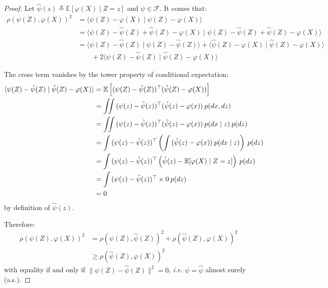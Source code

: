 \begin{proof}
	Let $\hat{\psi}(z)\triangleq\mathbb{E}[\varphi(X)\mid Z=z]$ and $\psi\in\mathcal{F}$. It comes that:
	\begin{equation}
		\begin{aligned}
		\rho(\psi(Z),\varphi(X))^2&=\langle\psi(Z)-\varphi(X)\mid\psi(Z)-\varphi(X)\rangle\\
		&=\langle\psi(Z)-\hat{\psi}(Z)+\hat{\psi}(Z)-\varphi(X)\mid\psi(Z)-\hat{\psi}(Z)+\hat{\psi}(Z)-\varphi(X)\rangle\\
		&=\langle\psi(Z)-\hat{\psi}(Z)\mid\psi(Z)-\hat{\psi}(Z)\rangle+\langle\hat{\psi}(Z)-\varphi(X)\mid\hat{\psi}(Z)-\varphi(X)\rangle\\
		&\qquad+2\langle\psi(Z)-\hat{\psi}(Z)\mid\hat{\psi}(Z)-\varphi(X)\rangle
		\end{aligned}
	\end{equation}

	The cross term vanishes by the tower property of conditional expectation:
	\begin{equation}
		\begin{aligned}
		\langle\psi(Z)-\hat{\psi}(Z)\mid\hat{\psi}(Z)-\varphi(X)\rangle&=\mathbb{E}\left[(\psi(Z)-\hat{\psi}(Z))^\top(\hat{\psi}(Z)-\varphi(X))\right]\\
		&=\iint{(\psi(z)-\hat{\psi}(z))^\top(\hat{\psi}(z)-\varphi(x))\:p(dx,dz)}\\
		&=\iint{(\psi(z)-\hat{\psi}(z))^\top(\hat{\psi}(z)-\varphi(x))\:p(dx\mid z)\:p(dz)}\\
		&=\int{(\psi(z)-\hat\psi(z))^\top\left(\int{(\hat\psi(z)-\varphi(x))\:p(dx\mid z)}\right)\:p(dz)}\hspace{-18pt}\\
		&=\int{(\psi(z)-\hat\psi(z))^\top\left(\hat\psi(z)-\mathbb{E}[\varphi(X)\mid Z=z]\right)\:p(dz)}\hspace{-4pt}\\
		&=\int{(\psi(z)-\hat\psi(z))^\top\times0\:p(dz)}\\
		&=0
		\end{aligned}
	\end{equation}
	by definition of $\hat\psi(z)$.

	Therefore:
	\begin{equation}
		\begin{aligned}
		\rho(\psi(Z),\varphi(X))^2&=\rho(\psi(Z),\hat{\psi}(Z))^2+\rho(\hat{\psi}(Z),\varphi(X))^2\\
		&\geq\rho(\hat{\psi}(Z),\varphi(X))^2
		\end{aligned}
	\end{equation}
	with equality if and only if $\|\psi(Z)-\hat{\psi}(Z)\|^2=0$, \textit{i.e.} $\psi=\hat{\psi}$ almost surely (a.s.).
\end{proof}

